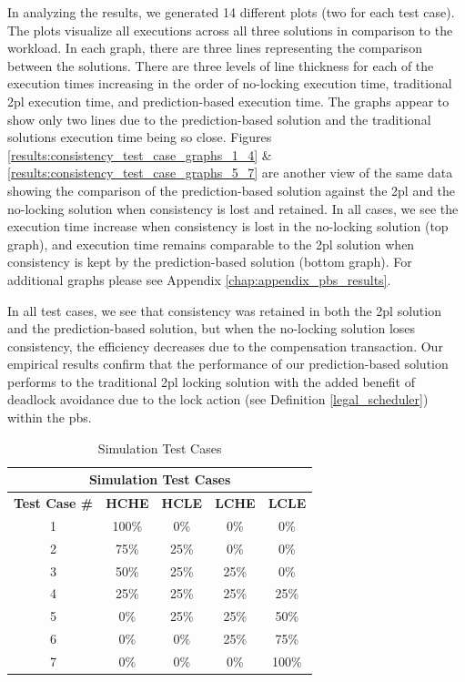 In analyzing the results, we generated 14 different plots (two for each test case). The plots visualize all executions across all three solutions in comparison to the workload. In each graph, there are three lines representing the comparison between the solutions. There are three levels of line thickness for each of the execution times increasing in the order of no-locking execution time, traditional \gls{2pl} execution time, and prediction-based execution time. The graphs appear to show only two lines due to the prediction-based solution and the traditional solutions execution time being so close. Figures \ref{results:consistency_test_case_graphs_1_4} \& \ref{results:consistency_test_case_graphs_5_7} are another view of the same data showing the comparison of the prediction-based solution against the \gls{2pl} and the no-locking solution when consistency is lost and retained. In all cases, we see the execution time increase when consistency is lost in the no-locking solution (top graph), and execution time remains comparable to the \gls{2pl} solution when consistency is kept by the prediction-based solution (bottom graph). For additional graphs please see Appendix \ref{chap:appendix_pbs_results}.

In all test cases, we see that consistency was retained in both the \gls{2pl} solution and the prediction-based solution, but when the no-locking solution loses consistency, the efficiency decreases due to the compensation transaction. Our empirical results confirm that the performance of our prediction-based solution performs to the traditional \gls{2pl} locking solution with the added benefit of deadlock avoidance due to the lock action (see Definition \ref{legal_scheduler}) within the \gls{pbs}.

\begin{table}[h]
\captionsetup{justification=centering}
\centering
\begin{tabular}{|c|c|c|c|c|}
\hline
\multicolumn{5}{|c|}{\cellcolor[HTML]{EFEFEF}\textbf{Simulation Test Cases}}                                                   \\ \hline
\textbf{Test Case \#} & \textbf{HCHE} & \textbf{HCLE} & \textbf{LCHE} & \textbf{LCLE} \\ \hline
1 & 100\% & 0\% & 0\% & 0\% \\ \hline
2 & 75\% & 25\% & 0\% & 0\% \\ \hline
3 & 50\% & 25\% & 25\% & 0\% \\ \hline
4 & 25\% & 25\% & 25\% & 25\% \\ \hline
5 & 0\% & 25\% & 25\% & 50\% \\ \hline
6 & 0\% & 0\% & 25\% & 75\% \\ \hline
7 & 0\% & 0\% & 0\% & 100\% \\ \hline
\end{tabular}

\caption{Simulation Test Cases} %
\label{tbl:sim_test_cases} %

\end{table}

